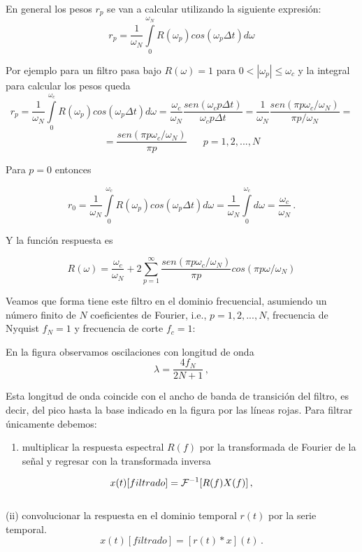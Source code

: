 \documentclass[
]{agujournal2019}
\providecommand{\tightlist}{%
  \setlength{\itemsep}{0pt}\setlength{\parskip}{0pt}}\usepackage{longtable,booktabs,array}
\begin{document}
En general los pesos \(r_p\) se van a calcular utilizando la siguiente
expresión:
\[r_p=\frac{1}{\omega_N}\int\limits^{\omega_N}_0 R(\omega_p) cos(\omega_p \Delta t
)d{\omega}\]

Por ejemplo para un filtro pasa bajo \(R(\omega)=1\) para
\(0<|\omega_p|\le \omega_c\) y la integral para calcular los pesos queda
\[r_p=\frac{1}{\omega_N}\int\limits^{\omega_c}_0 R(\omega_p) cos(\omega_p \Delta t
)d{\omega}=\frac{\omega_c}{\omega_N}\frac{sen(\omega_c p \Delta t)}{\omega_c p \Delta t}=
      \frac{1}{\omega_N}\frac{sen(\pi p \omega_c / \omega_N)}{\pi p / \omega_N}=\]
\[=\frac{sen(\pi p \omega_c / \omega_N)}{\pi p}\,\,\,\,\,\,\,\,\,\,p=1,2,...,N\]

Para \(p=0\) entonces

\[r_0=\frac{1}{\omega_N}\int\limits^{\omega_c}_0 R(\omega_p) cos(\omega_p \Delta t
)d{\omega}=\frac{1}{\omega_N}\int\limits^{\omega_c}_0 d{\omega}=\frac{\omega_c}{\omega_N}\,.\]

Y la función respuesta es

\[R(\omega)=\frac{\omega_c}{\omega_N} + 2\sum\limits^{\infty}_{p=1}
\frac{sen(\pi p \omega_c / \omega_N)}{\pi p}cos(\pi p \omega / \omega_N)\]

Veamos que forma tiene este filtro en el dominio frecuencial, asumiendo
un número finito de \(N\) coeficientes de Fourier, i.e.,
\(p=1,2,...,N\), frecuencia de Nyquist \(f_N=1\) y frecuencia de corte
\(f_c=1\):

\begin{center}
\end{center}

En la figura observamos oscilaciones con longitud de onda
\[\lambda=\frac{4f_N}{2N+1}\,,\]

Esta longitud de onda coincide con el ancho de banda de transición del
filtro, es decir, del pico hasta la base indicado en la figura por las
líneas rojas. Para filtrar únicamente debemos: ~

\begin{enumerate}
\def\labelenumi{(\roman{enumi})}
\tightlist
\item
  multiplicar la respuesta espectral \(R(f)\) por la transformada de
  Fourier de la señal y regresar con la transformada inversa
\end{enumerate}

\[x(t)[filtrado]={\cal F}^{-1}[R(f)X(f)]\,,\]\\
(ii) convolucionar la respuesta en el dominio temporal \(r(t)\) por la
serie temporal. \[x(t)[{ filtrado}]=[r(t)*x](t)\,.\]\\
\end{document}
